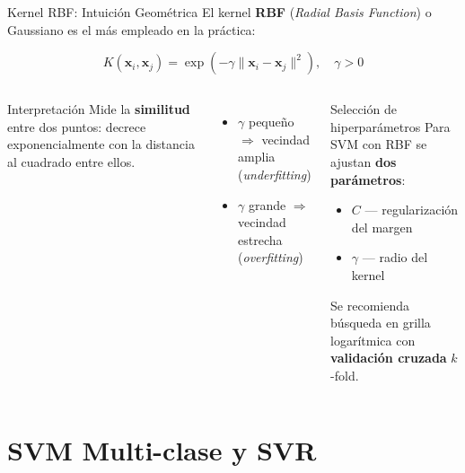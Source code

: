 \documentclass[aspectratio=169,xcolor=dvipsnames]{beamer}
\begin{document}
\begin{frame}{Kernel RBF: Intuición Geométrica}
    El kernel \textbf{RBF} (\textit{Radial Basis Function}) o Gaussiano es el más empleado en la práctica:

    \begin{equation}
        K(\mathbf{x}_i, \mathbf{x}_j) = \exp\!\left(-\gamma\|\mathbf{x}_i - \mathbf{x}_j\|^2\right), \quad \gamma > 0
    \end{equation}

    \begin{columns}
        \begin{block}{Interpretación}
            Mide la \textbf{similitud} entre dos puntos: decrece exponencialmente con la distancia al cuadrado entre ellos.
        \end{block}
        \begin{itemize}
            \item $\gamma$ pequeño $\Rightarrow$ vecindad amplia (\textit{underfitting})
            \item $\gamma$ grande $\Rightarrow$ vecindad estrecha (\textit{overfitting})
        \end{itemize}

        \begin{alertblock}{Selección de hiperparámetros}
            Para SVM con RBF se ajustan \textbf{dos parámetros}:
            \begin{itemize}
                \item $C$ — regularización del margen
                \item $\gamma$ — radio del kernel
            \end{itemize}
            Se recomienda búsqueda en grilla logarítmica con \textbf{validación cruzada} $k$-fold.
        \end{alertblock}
    \end{columns}
\end{frame}

\section{SVM Multi-clase y SVR}
\end{document}
